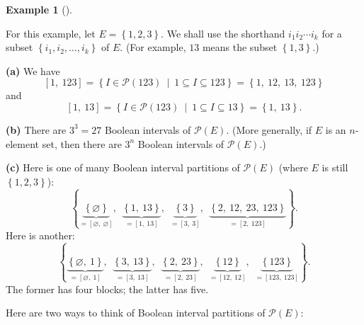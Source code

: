 \documentclass[numbers=enddot,12pt,final,onecolumn]{scrartcl}%
\theoremstyle{definition}
\newtheorem{exam}[theo]{Example}
\newenvironment{example}[1][]
{\begin{exam}[#1]\begin{leftbar}}
{\end{leftbar}\end{exam}}
\begin{document}
\begin{example}
\label{exa.bip.bip.123}For this example, let $E=\left\{  1,2,3\right\}  $. We
shall use the shorthand $i_{1}i_{2}\cdots i_{k}$ for a subset $\left\{
i_{1},i_{2},\ldots,i_{k}\right\}  $ of $E$. (For example, $13$ means the
subset $\left\{  1,3\right\}  $.)

\textbf{(a)} We have
\[
\left[  1,\ 123\right]  =\left\{  I\in\mathcal{P}\left(  123\right)
\ \mid\ 1\subseteq I\subseteq123\right\}  =\left\{  1,\ 12,\ 13,\ 123\right\}
\]
and%
\[
\left[  1,\ 13\right]  =\left\{  I\in\mathcal{P}\left(  123\right)
\ \mid\ 1\subseteq I\subseteq13\right\}  =\left\{  1,\ 13\right\}  .
\]


\textbf{(b)} There are $3^{3}=27$ Boolean intervals of $\mathcal{P}\left(
E\right)  $. (More generally, if $E$ is an $n$-element set, then there are
$3^{n}$ Boolean intervals of $\mathcal{P}\left(  E\right)  $.)

\textbf{(c)} Here is one of many Boolean interval partitions of $\mathcal{P}%
\left(  E\right)  $ (where $E$ is still $\left\{  1,2,3\right\}  $):%
\[
\left\{  \underbrace{\left\{  \varnothing\right\}  }_{=\left[  \varnothing
,\ \varnothing\right]  },\ \ \underbrace{\left\{  1,\ 13\right\}  }_{=\left[
1,\ 13\right]  },\ \ \underbrace{\left\{  3\right\}  }_{=\left[  3,\ 3\right]
},\ \ \underbrace{\left\{  2,\ 12,\ 23,\ 123\right\}  }_{=\left[
2,\ 123\right]  }\right\}  .
\]
Here is another:%
\[
\left\{  \underbrace{\left\{  \varnothing,\ 1\right\}  }_{=\left[
\varnothing,\ 1\right]  },\ \ \underbrace{\left\{  3,\ 13\right\}  }_{=\left[
3,\ 13\right]  },\ \ \underbrace{\left\{  2,\ 23\right\}  }_{=\left[
2,\ 23\right]  },\ \ \underbrace{\left\{  12\right\}  }_{=\left[
12,\ 12\right]  },\ \ \underbrace{\left\{  123\right\}  }_{=\left[
123,\ 123\right]  }\right\}  .
\]
The former has four blocks; the latter has five.
\end{example}

Here are two ways to think of Boolean interval partitions of $\mathcal{P}%
\left(  E\right)  $:
\end{document}
